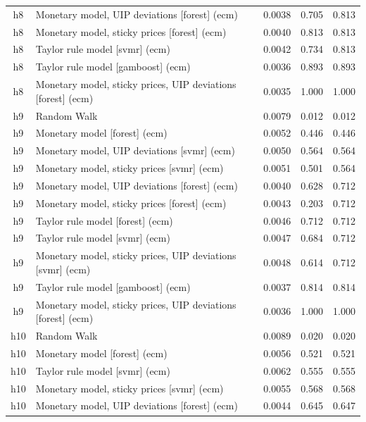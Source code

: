\begin{ThreePartTable}
\begin{longtable}[t]{cp{5.5cm}ccc}
h8 & \raggedright Monetary model, UIP deviations [forest] (ecm) & 0.0038 & 0.705 & 0.813\\
h8 & \raggedright Monetary model, sticky prices [forest] (ecm) & 0.0040 & 0.813 & 0.813\\
h8 & \raggedright Taylor rule model [svmr] (ecm) & 0.0042 & 0.734 & 0.813\\
h8 & \raggedright Taylor rule model [gamboost] (ecm) & 0.0036 & 0.893 & 0.893\\
h8 & \raggedright Monetary model, sticky prices, UIP deviations [forest] (ecm) & 0.0035 & 1.000 & 1.000\\
\addlinespace
h9 & \raggedright Random Walk & 0.0079 & 0.012 & 0.012\\
h9 & \raggedright Monetary model [forest] (ecm) & 0.0052 & 0.446 & 0.446\\
h9 & \raggedright Monetary model, UIP deviations [svmr] (ecm) & 0.0050 & 0.564 & 0.564\\
h9 & \raggedright Monetary model, sticky prices [svmr] (ecm) & 0.0051 & 0.501 & 0.564\\
h9 & \raggedright Monetary model, UIP deviations [forest] (ecm) & 0.0040 & 0.628 & 0.712\\
h9 & \raggedright Monetary model, sticky prices [forest] (ecm) & 0.0043 & 0.203 & 0.712\\
h9 & \raggedright Taylor rule model [forest] (ecm) & 0.0046 & 0.712 & 0.712\\
h9 & \raggedright Taylor rule model [svmr] (ecm) & 0.0047 & 0.684 & 0.712\\
h9 & \raggedright Monetary model, sticky prices, UIP deviations [svmr] (ecm) & 0.0048 & 0.614 & 0.712\\
h9 & \raggedright Taylor rule model [gamboost] (ecm) & 0.0037 & 0.814 & 0.814\\
h9 & \raggedright Monetary model, sticky prices, UIP deviations [forest] (ecm) & 0.0036 & 1.000 & 1.000\\
\addlinespace
h10 & \raggedright Random Walk & 0.0089 & 0.020 & 0.020\\
h10 & \raggedright Monetary model [forest] (ecm) & 0.0056 & 0.521 & 0.521\\
h10 & \raggedright Taylor rule model [svmr] (ecm) & 0.0062 & 0.555 & 0.555\\
h10 & \raggedright Monetary model, sticky prices [svmr] (ecm) & 0.0055 & 0.568 & 0.568\\
h10 & \raggedright Monetary model, UIP deviations [forest] (ecm) & 0.0044 & 0.645 & 0.647\\

\end{longtable}
\end{ThreePartTable}
